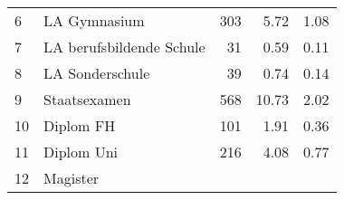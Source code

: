 \begin{longtable}{lXrrr}
     6 &
     \multicolumn{1}{X}{ LA Gymnasium   } &


       \num{303} &
       \num[round-mode=places,round-precision=2]{5,72} &
         \num[round-mode=places,round-precision=2]{1,08} \\

     7 &
     \multicolumn{1}{X}{ LA berufsbildende Schule   } &


       \num{31} &
       \num[round-mode=places,round-precision=2]{0,59} &
         \num[round-mode=places,round-precision=2]{0,11} \\

     8 &
     \multicolumn{1}{X}{ LA Sonderschule   } &


       \num{39} &
       \num[round-mode=places,round-precision=2]{0,74} &
         \num[round-mode=places,round-precision=2]{0,14} \\

     9 &
     \multicolumn{1}{X}{ Staatsexamen   } &


       \num{568} &
       \num[round-mode=places,round-precision=2]{10,73} &
         \num[round-mode=places,round-precision=2]{2,02} \\

     10 &
     \multicolumn{1}{X}{ Diplom FH   } &


       \num{101} &
       \num[round-mode=places,round-precision=2]{1,91} &
         \num[round-mode=places,round-precision=2]{0,36} \\

     11 &
     \multicolumn{1}{X}{ Diplom Uni   } &


       \num{216} &
       \num[round-mode=places,round-precision=2]{4,08} &
         \num[round-mode=places,round-precision=2]{0,77} \\

     12 &
     \multicolumn{1}{X}{ Magister   } &



\end{longtable}
